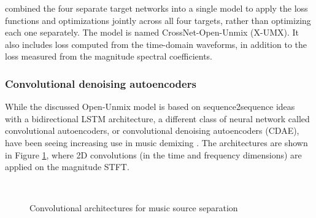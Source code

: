 \documentclass[report.tex]{subfiles}
\begin{document}

\textcite{xumx} combined the four separate target networks into a single model to apply the loss functions and optimizations jointly across all four targets, rather than optimizing each one separately. The model is named CrossNet-Open-Unmix (X-UMX). It also includes loss computed from the time-domain waveforms, in addition to the loss measured from the magnitude spectral coefficients.

\subsubsection{Convolutional denoising autoencoders}

While the discussed Open-Unmix model is based on sequence2sequence ideas with a bidirectional LSTM architecture, a different class of neural network called convolutional autoencoders, or convolutional denoising autoencoders (CDAE), have been seeing increasing use in music demixing \parencite{plumbley1, plumbley2}. The architectures are shown in Figure \ref{fig:cdaes}, where 2D convolutions (in the time and frequency dimensions) are applied on the magnitude STFT.

\begin{figure}[ht]
	\centering
	\\
	\caption{Convolutional architectures for music source separation}
	\label{fig:cdaes}
\end{figure}
\end{document}
